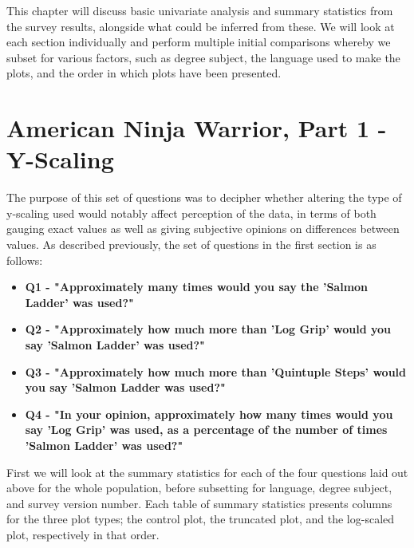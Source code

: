 
This chapter will discuss basic univariate analysis and summary statistics from the survey results, alongside what
could be inferred from these. We will look at each section individually and perform multiple initial comparisons
whereby we subset for various factors, such as degree subject, the language used to make the plots, and the order
in which plots have been presented.

\section{American Ninja Warrior, Part 1 - Y-Scaling}
The purpose of this set of questions was to decipher whether altering the type of y-scaling used would notably affect perception of the data, in 
terms of both gauging exact values as well as giving subjective opinions on differences between values. As described previously, the set of questions in the first section is as follows:

\begin{itemize}
    \item \textbf{Q1 - "Approximately many times would you say the 'Salmon Ladder' was used?"}
    \item \textbf{Q2 - "Approximately how much more than 'Log Grip' would you say 'Salmon Ladder' was used?"}
    \item \textbf{Q3 - "Approximately how much more than 'Quintuple Steps' would you say 'Salmon Ladder was used?"}
    \item \textbf{Q4 - "In your opinion, approximately how many times would you say 'Log Grip' was used, as a percentage of the number of times 'Salmon Ladder' was used?"}
\end{itemize}

First we will look at the summary statistics for each of the four questions laid out above for the whole population, before subsetting for language, degree subject, and survey version number. Each table of summary statistics presents columns for the three plot types; the control plot, the truncated plot, and the log-scaled plot, respectively in that order.














